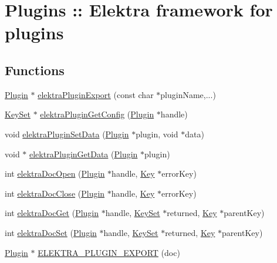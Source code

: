 \hypertarget{group__plugin}{
\section{Plugins :: Elektra framework for plugins}
\label{group__plugin}
}
\subsection*{Functions}
\begin{DoxyCompactItemize}
\item 
\hyperlink{struct__Plugin}{Plugin} $\ast$ \hyperlink{group__plugin_ga8dd092048e972a3f0c9c9f54eb41576e}{elektraPluginExport} (const char $\ast$pluginName,...)
\item 
\hyperlink{struct__KeySet}{KeySet} $\ast$ \hyperlink{group__plugin_ga644bead796506c172817724051c977c9}{elektraPluginGetConfig} (\hyperlink{struct__Plugin}{Plugin} $\ast$handle)
\item 
void \hyperlink{group__plugin_gaf4b941a52ff55d0ca2a9158d90208ef2}{elektraPluginSetData} (\hyperlink{struct__Plugin}{Plugin} $\ast$plugin, void $\ast$data)
\item 
void $\ast$ \hyperlink{group__plugin_gaafcf3216b46292f222b8cc7828b4dd20}{elektraPluginGetData} (\hyperlink{struct__Plugin}{Plugin} $\ast$plugin)
\item 
int \hyperlink{group__plugin_ga1e2cbea1275fc0d39a00a74eb69e12d8}{elektraDocOpen} (\hyperlink{struct__Plugin}{Plugin} $\ast$handle, \hyperlink{struct__Key}{Key} $\ast$errorKey)
\item 
int \hyperlink{group__plugin_gafb66a15abe15f79c9c5b3a928b42147d}{elektraDocClose} (\hyperlink{struct__Plugin}{Plugin} $\ast$handle, \hyperlink{struct__Key}{Key} $\ast$errorKey)
\item 
int \hyperlink{group__plugin_gacb69f3441c6d84241b4362f958fbe313}{elektraDocGet} (\hyperlink{struct__Plugin}{Plugin} $\ast$handle, \hyperlink{struct__KeySet}{KeySet} $\ast$returned, \hyperlink{struct__Key}{Key} $\ast$parentKey)
\item 
int \hyperlink{group__plugin_gae65781a1deb34efc79c8cb9d9174842c}{elektraDocSet} (\hyperlink{struct__Plugin}{Plugin} $\ast$handle, \hyperlink{struct__KeySet}{KeySet} $\ast$returned, \hyperlink{struct__Key}{Key} $\ast$parentKey)
\item 
\hyperlink{struct__Plugin}{Plugin} $\ast$ \hyperlink{group__plugin_gabe78724d2d477eef39997fd9b85bff16}{ELEKTRA\_\-PLUGIN\_\-EXPORT} (doc)
\end{DoxyCompactItemize}


